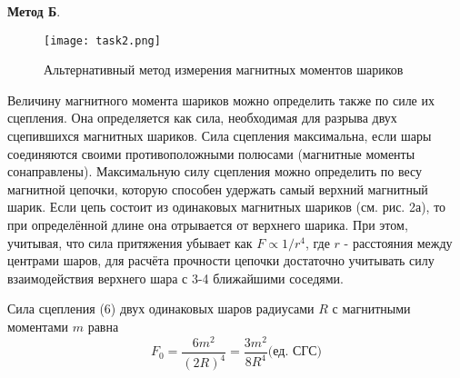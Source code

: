 \documentclass[12pt,a4paper]{article}
\begin{document}
\textbf{Метод Б}.
\begin{figure}[h!]
	\begin{center}
		\texttt{[image: task2.png]}
		\caption{Альтернативный метод измерения магнитных моментов шариков}
		\label{fig:facility}
	\end{center}
\end{figure}
    Величину магнитного момента шариков можно определить также по силе их сцепления. Она определяется как сила, необходимая для разрыва двух сцепившихся магнитных шариков. 
Сила сцепления максимальна, если шары соединяются своими противоположными полюсами (магнитные моменты сонаправлены).
    Максимальную силу сцепления можно определить по весу магнитной цепочки, которую способен удержать самый верхний магнитный шарик. Если цепь состоит из 
одинаковых магнитных шариков (см. рис. 2а), то при определённой длине она отрывается от верхнего шарика. При этом, учитывая, что сила притяжения 
убывает как $F \propto 1/r^4$, где $r$ - расстояния между центрами шаров, для расчёта прочности цепочки достаточно учитывать силу взаимодействия 
верхнего шара с 3-4 ближайшими соседями.

    Сила сцепления (6) двух одинаковых шаров радиусами $R$ с магнитными моментами $m$ равна
\begin{equation}
    F_0 = \frac{6m^2}{(2R)^4} = \frac{3m^2}{8R^4} \text{(ед. СГС)}
\end{equation} 
\label{R}
\end{document}
